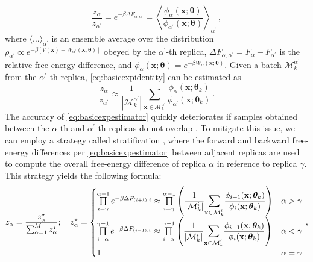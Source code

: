 \documentclass{article}
\numberwithin{equation}{section}
\def\*#1{\mathbf{#1}}
\theoremstyle{definition}
\theoremstyle{remark}
\def\thetab{\boldsymbol{\theta}}
\begin{document}
\begin{equation}
    \frac{z_\alpha}{z_{\alpha^\prime}}=e^{-\beta \Delta F_{\alpha, \alpha^\prime}} = \left\langle  \dfrac{\phi_{\alpha}(\* x;\thetab)}{\phi_{\alpha^\prime}(\* x;\thetab)} \right\rangle_{\alpha^\prime} \,, \label{eq:basicexpidentity}
\end{equation}
where $\langle \ldots \rangle_{\alpha^\prime}$ is an ensemble average over the distribution $\rho_{\alpha^\prime} \propto e^{-\beta [V(\* x)+W_{\alpha^\prime}(\* x; \thetab)]}$ obeyed by the $\alpha^\prime$-th replica, $\Delta F_{\alpha, \alpha^\prime} = F_{\alpha}- F_{\alpha^\prime}$ is the relative free-energy difference, and $\phi_\alpha(\*x; \thetab) = e^{-\beta W_\alpha(\*x; \thetab)}$. 
Given a batch $\mathcal{M}_k^{\alpha^\prime}$ from the $\alpha^\prime$-th replica, \cref{eq:basicexpidentity} can be estimated as
\begin{equation}
\frac{z_\alpha}{z_{\alpha^\prime}} \approx \frac{1}{|\mathcal{M}_k^{\alpha^\prime}|}  \sum_{\* x \in \mathcal{M}^{\alpha^\prime}_k} \dfrac{\phi_{\alpha}(\* x;\thetab_k)}{\phi_{\alpha^\prime}(\* x;\thetab_k)} \,. \label{eq:basicexpestimator}
\end{equation}
The accuracy of \cref{eq:basicexpestimator} quickly deteriorates if samples obtained between the $\alpha$-th and $\alpha^\prime$-th replicas do not overlap \cite{wu2005}.
To mitigate this issue, we can employ a strategy called stratification \cite{pohorille2010good}, where the forward and backward free-energy differences per \cref{eq:basicexpestimator} between adjacent replicas are used to compute the overall free-energy difference of replica $ \alpha $ in reference to replica $ \gamma $.
This strategy yields the following formula:
\begin{gather}
z_\alpha = \frac{z_\alpha^\star}{\sum_{\alpha=1}^M z_\alpha^\star}; \quad z_{\alpha }^\star = \begin{cases}
\prod\limits_{i=\gamma}^{\alpha-1}  e^{-\beta \Delta F_{(i+1),i}}  \approx \prod\limits_{i=\gamma}^{\alpha-1} \left(\dfrac{1}{|\mathcal{M}_k^i|}  \mathlarger{\sum}\limits_{\* x \in \mathcal{M}_k^i} \dfrac{\phi_{i+1}(\* x;\thetab_{k})}{\phi_i(\* x;\thetab_{k})}\right) & \alpha > \gamma
\\
\prod\limits_{i=\alpha}^{\gamma-1} e^{-\beta \Delta F_{(i-1),i}} \approx \prod\limits_{i=\alpha}^{\gamma-1} \left(\dfrac{1}{|\mathcal{M}_k^i|}  \mathlarger{\sum}\limits_{\* x \in \mathcal{M}_k^i} \dfrac{\phi_{i-1}(\* x;\thetab_{k})}{\phi_i(\* x;\thetab_{k})} \right) & \alpha < \gamma
\\
1 & \alpha = \gamma
\end{cases} \label{eq:expestimator} \,,
\end{gather}
\end{document}
